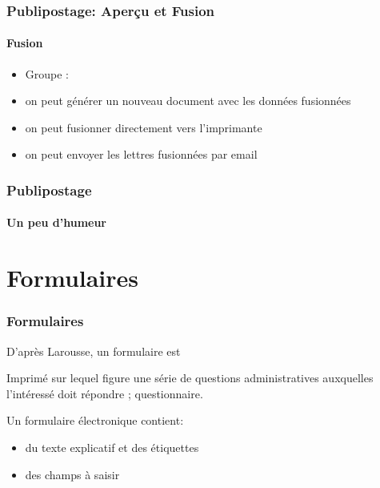 \documentclass[xcolor=table]{beamer}
\begin{document}
\begin{frame}
\frametitle{Publipostage: Aperçu et Fusion}
\framesubtitle{Fusion}

\begin{minipage}{0.69\textwidth}
	\begin{itemize}
		\item Groupe : 
		\item on peut générer un nouveau document avec les données fusionnées
		\item on peut fusionner directement vers l'imprimante
		\item on peut envoyer les lettres fusionnées par email
	\end{itemize}
\end{minipage}
\begin{minipage}{0.30\textwidth}
	
\end{minipage}


\end{frame}

\begin{frame}
\frametitle{Publipostage}
\framesubtitle{Un peu d'humeur}
\begin{center}
\end{center}
\end{frame}


\section{Formulaires}

\begin{frame}
\frametitle{Formulaires}

\begin{minipage}{0.50\textwidth}
	D'après Larousse, un formulaire est 
	{
	\setlength{\textwidth}{.9\textwidth}%
	\begin{definition}
		Imprimé sur lequel figure une série de questions administratives auxquelles l'intéressé doit répondre ; questionnaire.
	\end{definition}
    }

	Un formulaire électronique contient:
	\begin{itemize}
		\item du texte explicatif et des étiquettes
		\item des champs à saisir 
	\end{itemize}
\end{minipage}
\begin{minipage}{0.49\textwidth}
\end{minipage}

\end{frame}
\end{document}
